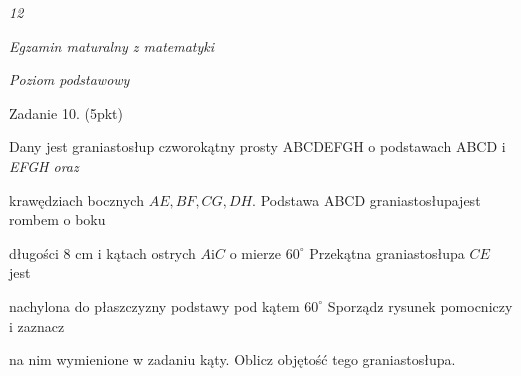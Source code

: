 \documentclass[a4paper,12pt]{article}
\begin{document}
{\it 12}

{\it Egzamin maturalny z matematyki}

{\it Poziom podstawowy}

Zadanie 10. (5pkt)

Dany jest graniastosłup czworokątny prosty ABCDEFGH o podstawach ABCD $\mathrm{i}$ {\it EFGH oraz}

krawędziach bocznych $AE, BF, CG, DH$. Podstawa ABCD graniastosłupajest rombem o boku

długości 8 cm i kątach ostrych $A \mathrm{i} C$ o mierze $60^{\circ}$ Przekątna graniastosłupa $CE$ jest

nachylona do płaszczyzny podstawy pod kątem $60^{\circ}$ Sporządz$\acute{}$ rysunek pomocniczy i zaznacz

na nim wymienione w zadaniu kąty. Oblicz objętość tego graniastosłupa.
\end{document}
